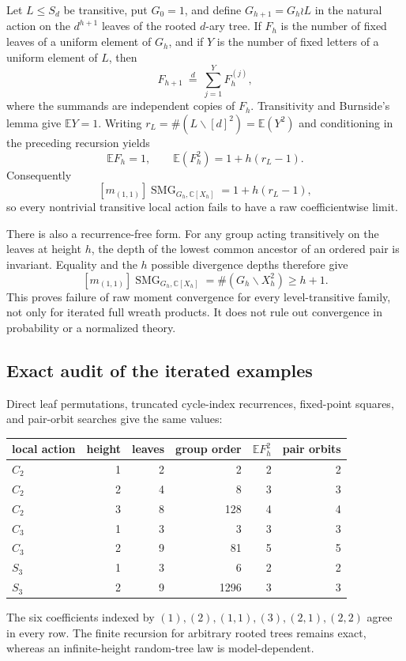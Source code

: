 \documentclass[10pt]{article}
\newcommand{\SMG}{\operatorname{SMG}}
\newcommand{\MGF}{\SMG}
\newcommand{\C}{\mathbb C}
\begin{document}
Let $L\leq S_d$ be transitive, put $G_0=1$, and define
$G_{h+1}=G_h\wr L$ in the natural action on the $d^{h+1}$ leaves of the
rooted $d$-ary tree.  If $F_h$ is the number of fixed leaves of a uniform
element of $G_h$, and if $Y$ is the number of fixed letters of a uniform
element of $L$, then
\begin{equation}\label{nd:symmetric_spin_lie_tree:eq:branching}
 F_{h+1}\ \stackrel{d}{=}\ \sum_{j=1}^{Y}F_h^{(j)},
\end{equation}
where the summands are independent copies of $F_h$.  Transitivity and
Burnside's lemma give $\mathbb E Y=1$.  Writing
$r_L=\#(L\backslash[d]^2)=\mathbb E(Y^2)$ and conditioning in the preceding
recursion yields
\begin{equation}\label{nd:symmetric_spin_lie_tree:eq:second-moment}
 \mathbb E F_h=1,\qquad
 \mathbb E(F_h^2)=1+h(r_L-1).
\end{equation}
Consequently
\[
 [m_{(1,1)}]\MGF_{G_h,\C[X_h]}=1+h(r_L-1),
\]
so every nontrivial transitive local action fails to have a raw
coefficientwise limit.

There is also a recurrence-free form.  For any group acting transitively on
the leaves at height $h$, the depth of the lowest common ancestor of an
ordered pair is invariant.  Equality and the $h$ possible divergence depths
therefore give
\begin{equation}\label{nd:symmetric_spin_lie_tree:eq:universal-bound}
 [m_{(1,1)}]\MGF_{G_h,\C[X_h]}
 =\#(G_h\backslash X_h^2)\ge h+1.
\end{equation}
This proves failure of raw moment convergence for every level-transitive
family, not only for iterated full wreath products.  It does not rule out
convergence in probability or a normalized theory.

\subsection{Exact audit of the iterated examples}

Direct leaf permutations, truncated cycle-index recurrences, fixed-point
squares, and pair-orbit searches give the same values:
\begin{center}
\small
\begin{tabular}{@{}lrrrrr@{}}\toprule
local action&height&leaves&group order&$\mathbb E F_h^2$&pair orbits\\\midrule
$C_2$&1&2&2&2&2\\
$C_2$&2&4&8&3&3\\
$C_2$&3&8&128&4&4\\
$C_3$&1&3&3&3&3\\
$C_3$&2&9&81&5&5\\
$S_3$&1&3&6&2&2\\
$S_3$&2&9&1296&3&3\\\bottomrule
\end{tabular}
\end{center}
The six coefficients indexed by $(1),(2),(1,1),(3),(2,1),(2,2)$ agree in
every row.  The finite recursion for arbitrary rooted trees remains exact,
whereas an infinite-height random-tree law is model-dependent.
\end{document}
